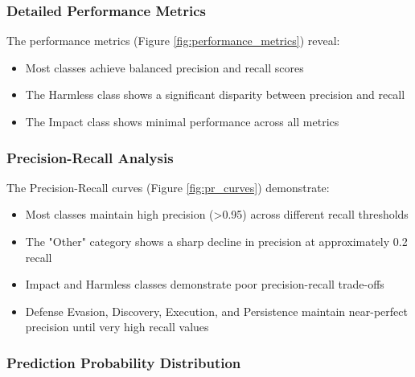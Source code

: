         \subsubsection{Detailed Performance Metrics}

            The performance metrics (Figure \ref{fig:performance_metrics}) reveal:

            \begin{itemize}
                \item Most classes achieve balanced precision and recall scores
                \item The Harmless class shows a significant disparity between precision and recall
                \item The Impact class shows minimal performance across all metrics
            \end{itemize}

        \subsubsection{Precision-Recall Analysis}

            The Precision-Recall curves (Figure \ref{fig:pr_curves}) demonstrate:

            \begin{itemize}
                \item Most classes maintain high precision (>0.95) across different recall thresholds
                \item The "Other" category shows a sharp decline in precision at approximately 0.2 recall
                \item Impact and Harmless classes demonstrate poor precision-recall trade-offs
                \item Defense Evasion, Discovery, Execution, and Persistence maintain near-perfect precision until very high recall values
            \end{itemize}

        \subsubsection{Prediction Probability Distribution \\}

            
            \vspace{-0.2cm}

